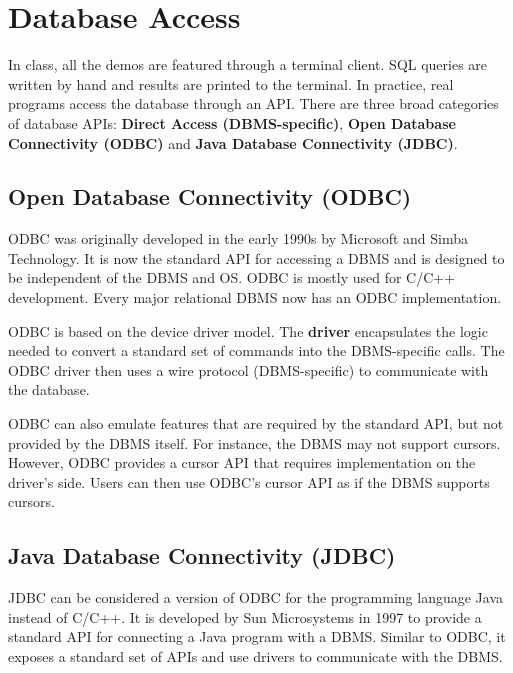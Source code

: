 \documentclass[11pt]{article}
\begin{document}
\maketitle
\thispagestyle{plain}

\section{Database Access}
In class, all the demos are featured through a terminal client. SQL queries are written by hand and results are printed to the terminal. In practice, real programs access the database through an API. There are three broad categories of database APIs: \textbf{Direct Access (DBMS-specific)}, \textbf{Open Database Connectivity (ODBC)} and \textbf{Java Database Connectivity (JDBC)}.

\subsection*{Open Database Connectivity (ODBC)}
ODBC was originally developed in the early 1990s by Microsoft and Simba Technology. It is now the standard API for accessing a DBMS and is designed to be independent of the DBMS and OS. ODBC is mostly used for C/C++ development. Every major relational DBMS now has an ODBC implementation.

ODBC is based on the device driver model. The \textbf{driver} encapsulates the logic needed to convert a standard set of commands into the DBMS-specific calls. The ODBC driver then uses a wire protocol (DBMS-specific) to communicate with the database.

ODBC can also emulate features that are required by the standard API, but not provided by the DBMS itself. For instance, the DBMS may not support cursors. However, ODBC provides a cursor API that requires implementation on the driver's side. Users can then use ODBC's cursor API as if the DBMS supports cursors.

\subsection*{Java Database Connectivity (JDBC)}
JDBC can be considered a version of ODBC for the programming language Java instead of C/C++. It is developed by Sun Microsystems in 1997 to provide a standard API for connecting a Java program with a DBMS. Similar to ODBC, it exposes a standard set of APIs and use drivers to communicate with the DBMS. 
\end{document}
